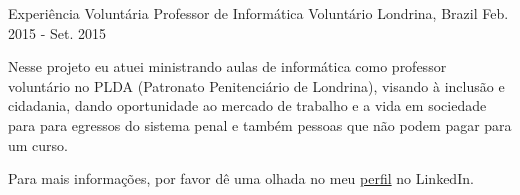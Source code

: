 

\begin{cventries}

  \cventry
    {Experiência Voluntária} %
    {Professor de Informática Voluntário} %
    {Londrina, Brazil} %
    {Feb. 2015 - Set. 2015} %
    {
      \begin{cvitems} %
        \item {Nesse projeto eu atuei ministrando aulas de informática como professor voluntário no PLDA (Patronato Penitenciário de Londrina), visando à inclusão e cidadania, dando oportunidade ao mercado de trabalho e a vida em sociedade para para egressos do sistema penal e também pessoas que não podem pagar para um curso.}
      \end{cvitems}
    }
\end{cventries}

Para mais informações, por favor dê uma olhada no meu {\color{awesome-orange}\href{https://br.linkedin.com/in/jessicaprandini}{perfil}} no LinkedIn.
